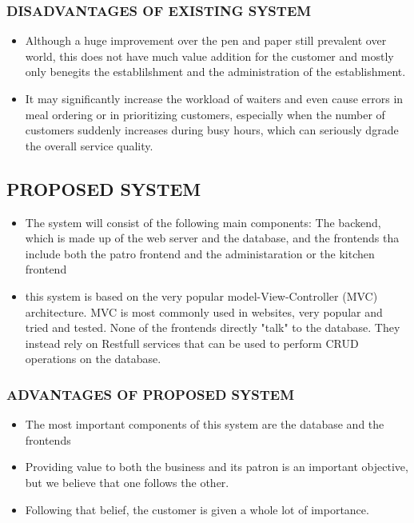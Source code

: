 \documentclass[12pt,a4paper]{article}
\begin{document}
	\subsubsection{DISADVANTAGES OF EXISTING SYSTEM}
	\begin{itemize}
		\item Although a huge improvement over the pen and paper still prevalent over world, this does not have much value addition for the customer and mostly only benegits the establilshment and the administration of the establishment.
		\item It may significantly increase the workload of waiters and even cause errors in meal ordering or in prioritizing customers, especially when the number of customers suddenly increases during busy hours, which can seriously dgrade the overall service quality.
	\end{itemize}
	
	
	\subsection{PROPOSED SYSTEM}
	\begin{itemize}
		\item The system will consist of the following main components: The backend, which is made up of the web server and the database, and the frontends tha include both the patro frontend and the administaration or the kitchen frontend 
		\item this system is based on the very popular model-View-Controller (MVC) architecture. MVC is most commonly used in websites, very popular and tried and tested. None of the frontends directly "talk" to the database. They instead rely on Restfull services that can be used to perform CRUD operations on the database.
	\end{itemize}
		
		\subsubsection{ADVANTAGES OF PROPOSED SYSTEM}
		\begin{itemize}
			\item The most important components of this system are the database and the frontends
			\item Providing value to both the business and its patron is an important objective, but we believe that one follows the other.
		\item Following that belief, the customer is given a whole lot of importance.
		\end{itemize}
		
\end{document}
